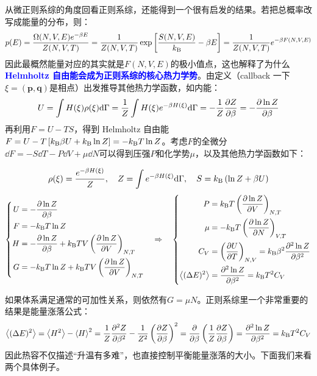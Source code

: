 从微正则系综的角度回看正则系综，还能得到一个很有启发的结果。若把总概率改写成能量的分布，则：
\begin{equation}\label{eq:eqnvt}
p(E)=\frac{\Omega(N,V,E)e^{-\beta E}}{Z(N,V,T)}=\frac{1}{Z(N,V,T)}\exp\left[\frac{S(N,V,E)}{k_{\rm B}}-\beta E\right]=\frac{1}{Z(N,V,T)}e^{-\beta F(N,V,E)}
\end{equation}
因此最概然能量对应的其实就是$F(N,V,E)$的极小值点，这也解释了为什么\textcolor{blue}{\textbf{ Helmholtz 自由能会成为正则系综的核心热力学势}}。由定义（callback 一下$\xi=(\bm{p},\bm{q})$是相点）出发推导其他热力学函数，如内能：
\[U=\int H(\xi)\rho(\xi)\dd\Gamma=\frac{1}{Z}\int H(\xi)e^{-\beta H(\xi)}\dd\Gamma=-\frac{1}{Z}\pdv{Z}{\beta}=-\pdv{\ln Z}{\beta}\]
再利用$F=U-TS$，得到 Helmholtz 自由能$F=U-T\left[k_{\rm B}\beta U+k_{\rm B}\ln Z\right]=-k_{\rm B}T\ln Z$。考虑$F$的全微分$\dd F=-S\dd T-P\dd V+\mu \dd N$可以得到压强$P$和化学势$\mu$，以及其他热力学函数如下：
\begin{theorem}[正则系综的基本热力学关系]
\[\rho(\xi)=\frac{e^{-\beta H(\xi)}}{Z},\quad Z=\int e^{-\beta H(\xi)}\dd\Gamma, \quad S=k_{\rm B}\left(\ln Z+\beta U\right)\]
\[\left\{\begin{aligned}
U&=-\pdv{\ln Z}{\beta}\\
F&=-k_{\rm B} T\ln Z\\
H&=-\pdv{\ln Z}{\beta}+k_{\rm B}TV\left(\pdv{\ln Z}{V}\right)_{N,T}\\
G&=-k_{\rm B} T\ln Z+k_{\rm B}TV\left(\pdv{\ln Z}{V}\right)_{N,T}
\end{aligned}\right.
\quad \Rightarrow \quad
\left\{\begin{aligned}
P&=k_{\rm B} T\left(\pdv{\ln Z}{V}\right)_{N,T}\\
\mu&=-k_{\rm B} T\left(\pdv{\ln Z}{N}\right)_{V,T}\\
C_V&=\left(\pdv{U}{T}\right)_{N,V}=k_{\rm B}\beta^2\pdv[2]{\ln Z}{\beta}\\
\expval{(\Delta E)^2}&=\pdv[2]{\ln Z}{\beta}=k_{\rm B} T^2 C_V
\end{aligned}\right.\]
\end{theorem}
如果体系满足通常的可加性关系，则依然有$G=\mu N$。正则系综里一个非常重要的结果是能量涨落公式：
\[\expval{(\Delta E)^2}=\expval{H^2}-\expval{H}^2=\frac{1}{Z}\pdv[2]{Z}{\beta}-\frac{1}{Z^2}\left(\pdv{Z}{\beta}\right)^2=\pdv{\beta}\left(\frac{1}{Z}\pdv{Z}{\beta}\right)=\pdv[2]{\ln Z}{\beta}=k_{\rm B} T^2 C_V\]
因此热容不仅描述“升温有多难”，也直接控制平衡能量涨落的大小。下面我们来看两个具体例子。

